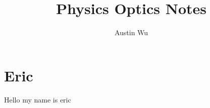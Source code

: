 \documentclass{report}
\title{Physics Optics Notes }
\author{Austin Wu}
\date{}
\begin{document}
    \maketitle
    \newpage%
    \tableofcontents \pagebreak 
    \chapter{Eric}
    Hello my name is eric 
\end{document}
